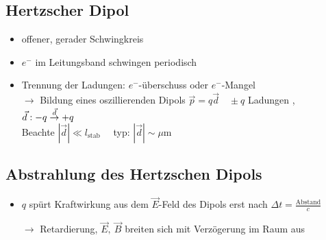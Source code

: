 \documentclass[titlepage,12pt,a4paper,ngerman]{report}
\newcommand{\tx}[1]{\textrm{#1}}
\begin{document}
\subsection{Hertzscher Dipol}
\begin{itemize}
	\item offener, gerader Schwingkreis
	\item $ e^- $ im Leitungsband schwingen periodisch 
	\item Trennung der Ladungen: $ e^- $-überschuss oder $ e^- $-Mangel\\
	$ \rightarrow $ Bildung eines oszillierenden Dipols
	$ \vec{p} = q \vec{d}\quad \pm q $ Ladungen , $ \vec{d} : -q \buildrel \vec{d} \over \rightarrow +q $\\
	Beachte $ |\vec{d}| \ll l_{\tx{stab}} \quad $ typ: $ |\vec{d}| \sim \mu\tx{m} $
\end{itemize}

\subsection{Abstrahlung des Hertzschen Dipols}
\begin{itemize}
	\item $ q $ spürt Kraftwirkung aus dem $ \vec{E} $-Feld des Dipols erst nach $ \Delta t = \frac{\tx{Abstand}}{c} $\\
	\item[$ \rightarrow $] Retardierung, $ \vec{E}, \ \vec{B} $ breiten sich mit Verzögerung im Raum aus
\end{itemize}
\end{document}
